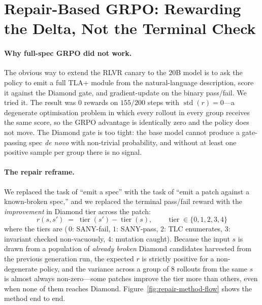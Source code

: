 \documentclass[11pt]{article}
\begin{document}
\section{Repair-Based GRPO: Rewarding the Delta, Not the Terminal Check}
\label{sec:repair-grpo}

\paragraph{Why full-spec GRPO did not work.} The obvious way to extend
the RLVR canary to the $20$B model is to ask the policy to emit a
full TLA+ module from the natural-language description, score it
against the Diamond gate, and gradient-update on the binary pass/fail.
We tried it. The result was $0$ rewards on $155/200$ steps with
$\operatorname{std}(r)=0$---a degenerate optimisation problem in which
every rollout in every group receives the same score, so the GRPO
advantage is identically zero and the policy does not move. The
Diamond gate is too tight: the base model cannot produce a gate-passing
spec \emph{de novo} with non-trivial probability, and without at least
one positive sample per group there is no signal.

\paragraph{The repair reframe.} We replaced the task of ``emit a spec''
with the task of ``emit a patch against a known-broken spec,'' and we
replaced the terminal pass/fail reward with the \emph{improvement}
in Diamond tier across the patch:
\[
  r(s, s') \;=\; \operatorname{tier}(s') - \operatorname{tier}(s),
  \qquad \operatorname{tier}\in\{0,1,2,3,4\}
\]
where the tiers are (\,$0$: SANY-fail, $1$: SANY-pass, $2$: TLC
enumerates, $3$: invariant checked non-vacuously, $4$: mutation caught).
Because the input $s$ is drawn from a population of \emph{already broken}
Diamond candidates harvested from the previous generation run, the
expected $r$ is strictly positive for a non-degenerate policy, and the
variance across a group of $8$ rollouts from the same $s$ is almost
always non-zero---some patches improve the tier more than others, even
when none of them reaches Diamond. Figure~\ref{fig:repair-method-flow}
shows the method end to end.
\end{document}
